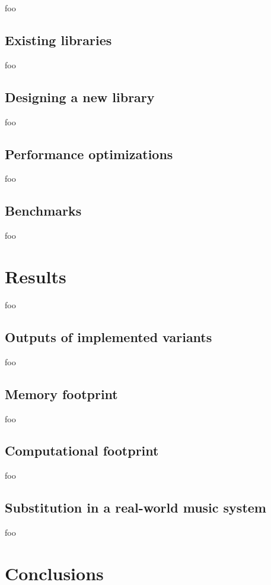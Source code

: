 \documentclass[letter,12pt]{article}
\begin{document}
foo

\subsection{Existing libraries}

foo

\subsection{Designing a new library}

foo

\subsection{Performance optimizations}

foo

\subsection{Benchmarks}

foo

\section{Results}

foo

\subsection{Outputs of implemented variants}

foo

\subsection{Memory footprint}

foo

\subsection{Computational footprint}

foo

\subsection{Substitution in a real-world music system}

foo

\section{Conclusions}
\end{document}
